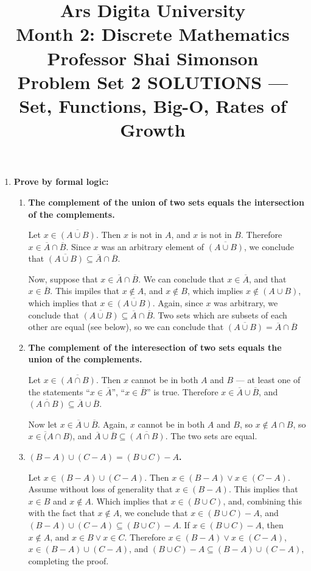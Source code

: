 \documentclass[12pt]{amsart}
\title[Problem Set 2]{Ars Digita University\\Month 2:  Discrete Mathematics\\Professor Shai Simonson\\Problem Set 2 SOLUTIONS --- Set, Functions, Big-O, Rates of Growth}
\begin{document}
\maketitle

\begin{enumerate}
\item {\bf Prove by formal logic:}
\begin{enumerate}
\item {\bf The complement of the union of two sets equals the intersection of the complements.}

Let $x \in \overline{(A \cup B)}$.  Then $x$ is not in $A$, and $x$ is not in $B$.  Therefore $x \in \overline{A} \cap \overline{B}$.  Since $x$ was an arbitrary element of $\overline{(A \cup B)}$, we conclude that $\overline{(A \cup B)} \subseteq \overline{A} \cap \overline{B}$.

Now, suppose that $x \in \overline{A} \cap \overline{B}$.  We can conclude that $x \in \overline{A}$, and that $x \in \overline{B}$.  This impiles that $x \notin A$, and $x \notin B$, which implies $x \notin (A \cup B)$, which implies that $x \in \overline{(A \cup B)}$.  Again, since $x$ was arbitrary, we conclude that $\overline{(A \cup B)} \subseteq \overline{A} \cap \overline{B}$.  Two sets which are subsets of each other are equal (see below), so we can conclude that $\overline{(A \cup B)} = \overline{A} \cap \overline{B}$

\item {\bf The complement of the interesection of two sets equals the union of the complements.}

Let $x \in \overline{(A \cap B)}$.  Then $x$ cannot be in both $A$ and
$B$ --- at least one of the statements ``$x \in \overline{A}$'', ``$x
\in \overline{B}$'' is true.  Therefore $x \in \overline{A} \cup \overline{B}$, and $\overline{(A \cap B)} \subseteq \overline{A} \cup \overline{B}$.

Now let $x \in \overline{A} \cup \overline{B}$.  Again, $x$ cannot be
in both $A$ and $B$, so $x \notin A \cap B$, so $x \in \overline(A
\cap B)$, and $\overline{A} \cup \overline{B} \subseteq \overline{(A
\cap B)}$.  The two sets are equal.

\item {\bf $(B-A) \cup (C-A) = (B \cup C) - A$.}

Let $x \in (B-A) \cup (C-A)$.  Then $x \in (B-A) \lor x \in (C-A)$.
Assume without loss of generality that $x \in (B-A)$.  This implies
that $x \in B$ and $x \notin A$.  Which implies that $x \in (B \cup
C)$, and, combining this with the fact that $x \notin A$, we conclude
that $x \in (B \cup C) - A$, and $(B-A) \cup (C-A) \subseteq (B \cup
C) - A$.  If $x \in (B \cup C) - A$, then $x \notin A$, and $x \in B
\lor x \in C$.  Therefore $x \in (B-A) \lor x \in (C-A)$, $x \in (B-A)
\cup (C-A)$, and $(B \cup C) - A \subseteq (B-A) \cup (C-A)$,
completing the proof.


\end{enumerate}
\end{enumerate}
\end{document}
